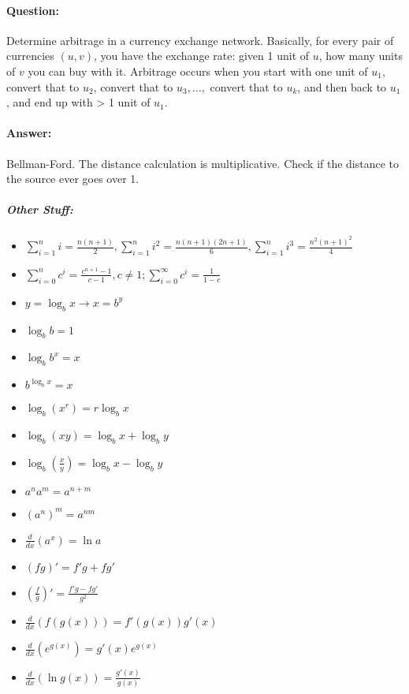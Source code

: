 \documentclass{article}
\begin{document}
\paragraph{Question:} Determine arbitrage in a currency exchange network. Basically, for every pair of currencies \((u, v)\), you have the exchange rate: given 1 unit of \(u\), how many units of \(v\) you can buy with it. Arbitrage occurs when you start with one unit of \(u_1\), convert that to \(u_2\), convert that to \(u_3,\ldots,\) convert that to \(u_k\), and then back to \(u_1\), and end up with > 1 unit of \(u_1\).

\paragraph{Answer:} Bellman-Ford. The distance calculation is multiplicative. Check if the distance to the source ever goes over 1.

\subparagraph{Other Stuff:}
\begin{itemize}
    \item[] \(\sum\limits_{i=1}^{n}i = \frac{n(n+1)}{2},\sum\limits_{i=1}^{n}i^2 = \frac{n(n+1)(2n+1)}{6}, \sum\limits_{i=1}^{n} i^3 = \frac{n^2(n+1)^2}{4}\)
    \item[] \(\sum\limits_{i=0}^{n}c^i = \frac{c^{n+1}-1}{c-1}, c \neq 1; \sum\limits_{i=0}^{\infty}c^i = \frac{1}{1-c}\)
    \item[] \(y = \log_bx \rightarrow x = b^y\)
    \item[] \(\log_bb = 1\)
    \item[] \(\log_bb^x = x\)
    \item[] \(b^{\log_bx}=x\)
    \item[] \(\log_b(x^r)=r\log_bx\)
    \item[] \(\log_b(xy) = \log_bx+\log_by\)
    \item[] \(\log_b\left(\frac{x}{y}\right)=\log_bx-\log_by\)
    \item[] \(a^n a^m = a^{n+m}\)
    \item[] \((a^n)^m = a^{nm}\)
    \item[] \(\frac{d}{dx}(a^x) = \ln a\)
    \item[] \((fg)' = f'g + fg'\)
    \item[] \(\left(\frac{f}{g}\right)' = \frac{f'g-fg'}{g^2}\)
    \item[] \(\frac{d}{dx}(f(g(x)))=f'(g(x))g'(x)\)
    \item[] \(\frac{d}{dx}(e^{g(x)})= g'(x)e^{g(x)}\)
    \item[] \(\frac{d}{dx}(\ln g(x)) = \frac{g'(x)}{g(x)}\)
\end{itemize}
\end{document}
